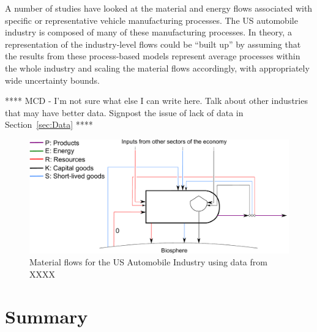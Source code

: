 A number of studies have looked at 
the material and energy flows 
associated with specific or representative vehicle manufacturing 
processes.\cite{Sullivan1998, MacLean1998,Schweimer2000,
McCleese2002,MacLean2003, Burnham2006,Sullivan2010, Hawkins2012}
The US automobile industry is composed
of many of these manufacturing processes.
In theory,
a representation of the industry-level flows
could be ``built up'' by assuming that the results from
these process-based models represent average
processes within the whole industry and 
scaling the material flows accordingly,
with appropriately wide uncertainty bounds.


**** MCD - I'm not sure what else I can write here.
Talk about other industries
that may have better data.
Signpost the issue of lack of data in Section~\ref{sec:Data}
****

\begin{figure}[!ht]
\centering
\includegraphics[width=0.8\linewidth]{Part_1/Chapter_Materials/images/PERKS_basic_unit_materials_auto_ind.pdf}
\caption[Material flows for the US Automobile Industry]{Material flows for the US Automobile Industry using data from XXXX}
\label{fig:PERKS_materials_auto}
\end{figure}

\section{Summary}
\label{sec:materials_summary}






